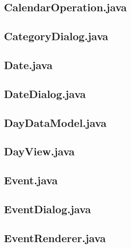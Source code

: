 \documentclass{article}
\begin{document}
\subsection{CalendarOperation.java}



\subsection{CategoryDialog.java}



\subsection{Date.java}



\subsection{DateDialog.java}



\subsection{DayDataModel.java}



\subsection{DayView.java}



\subsection{Event.java}



\subsection{EventDialog.java}



\subsection{EventRenderer.java}
\end{document}
